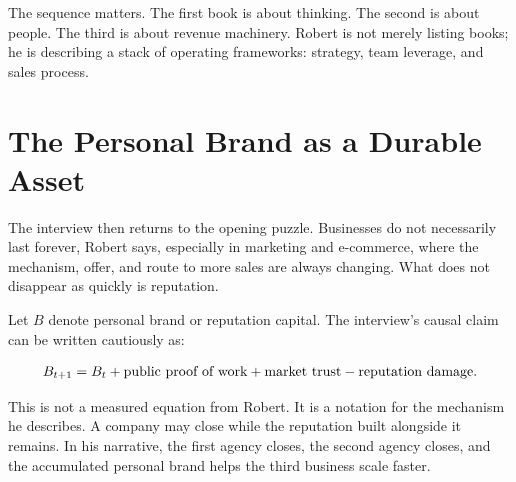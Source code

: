 The sequence matters. The first book is about thinking. The second is about people. The third is about revenue machinery. Robert is not merely listing books; he is describing a stack of operating frameworks: strategy, team leverage, and sales process.

\section{The Personal Brand as a Durable Asset}

The interview then returns to the opening puzzle. Businesses do not necessarily last forever, Robert says, especially in marketing and e-commerce, where the mechanism, offer, and route to more sales are always changing. What does not disappear as quickly is reputation.

Let \(B\) denote personal brand or reputation capital. The interview's causal claim can be written cautiously as:

\begin{equation}
B_{t+1} = B_t + \hbox{public proof of work} + \hbox{market trust} - \hbox{reputation damage}.
\end{equation}

This is not a measured equation from Robert. It is a notation for the mechanism he describes. A company may close while the reputation built alongside it remains. In his narrative, the first agency closes, the second agency closes, and the accumulated personal brand helps the third business scale faster.

\begin{figure}
\centering
{}
\end{figure}


